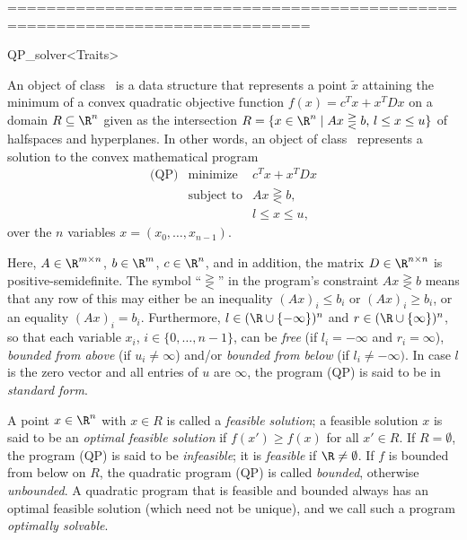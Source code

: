  =============================================================================

\begin{ccRefClass}{QP_solver<Traits>}

\ccDefinition An object of class \ccRefName\ is a data structure
that represents a point $\tilde{x}$ attaining the minimum of a convex
quadratic objective function $f(x)=c^{T}x+x^{T}Dx$ on
a domain $R \subseteq \R^{n}$ given as the intersection $R=\{ x\in\R^n
\mid \mbox{$Ax\gtreqless b$, $l \le x \le u$}\}$ of halfspaces and
hyperplanes. In other words, an object of class \ccRefName\ represents
a solution to the convex mathematical program
\begin{eqnarray*}
\mbox{(QP)}&\mbox{minimize} & c^{T}x+x^{T}Dx \\
&\mbox{subject to}   & Ax \gtreqless b, \\
&& l \leq x \leq u,
\end{eqnarray*}
over the $n$ variables $x=(x_0,\ldots,x_{n-1})$.

Here, $A \in \R^{m \times n}$, $b \in \R^{m}$, $c \in \R^{n}$, and in
addition, the matrix $D \in \R^{n \times n}$ is positive-semidefinite.
The symbol ``$\gtreqless$'' in the program's constraint $Ax \gtreqless
b$ means that any row of this may either be an inequality $(Ax)_i \leq b_i$ or
$(Ax)_i \geq b_i$, or an equality $(Ax)_i = b_i$.  Furthermore, $l\in
(\R\cup\{-\infty\})^n$ and $r\in (\R\cup\{\infty\})^n$, so that each
variable $x_i$, $i\in\{0,\ldots,n-1\}$, can be \emph{free} (if
$l_i=-\infty$ and $r_i=\infty$), \emph{bounded from above} (if
$u_i\not=\infty$) and/or \emph{bounded from below} (if
$l_i\not=-\infty)$.  In case $l$ is the zero vector and all entries of
$u$ are $\infty$, the program (QP) is said to be in \emph{standard
form}.

A point $x \in \R^{n}$ with $x\in R$ is called a \emph{feasible
solution}; a feasible solution $x$ is said to be an \emph{optimal
feasible solution} if $f(x')\geq f(x)$ for all $x'\in R$.  If
$R=\emptyset$, the program (QP) is said to be \emph{infeasible};
it is \emph{feasible} if $\R\not=\emptyset$.  If $f$ is bounded from
below on $R$, the quadratic program (QP) is called \emph{bounded},
otherwise \emph{unbounded}.  A quadratic program that is feasible and
bounded always has an optimal feasible solution (which need not be
unique), and we call such a program \emph{optimally solvable}.


\end{ccRefClass}
